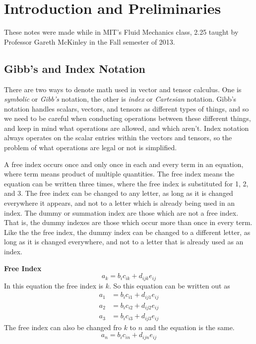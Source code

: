 \chapter{Introduction and Preliminaries}

These notes were made while in MIT's Fluid Mechanics class, 2.25 taught by Professor Gareth McKinley in the Fall semester of 2013.

\section{Gibb's and Index Notation}

There are two ways to denote math used in vector and tensor calculus.
One is \textit{symbolic} or \textit{Gibb's} notation, the other is \textit{index} or \textit{Cartesian} notation.
Gibb's notation handles scalars, vectors, and tensors as different types of things, and so we need to be careful when conducting operations between these different things, and keep in mind what operations are allowed, and which aren't.
Index notation always operates on the scalar entries within the vectors and tensors, so the problem of what operations are legal or not is simplified.

A free index occurs once and only once in each and every term in an equation, where term means product of multiple quantities.
The free index means the equation can be written three times, where the free index is substituted for 1, 2, and 3.
The free index can be changed to any letter, as long as it is changed everywhere it appears, and not to a letter which is already being used in an index.
The dummy or summation index are those which are not a free index.
That is, the dummy indexes are those which occur more than once in every term.
Like the the free index, the dummy index can be changed to a different letter, as long as it is changed everywhere, and not to a letter that is already used as an index.

\begin{example}
  \textbf{Free Index}
  \begin{equation*}
    a_{k}=b_{i}c_{ik}+d_{ijk}e_{ij}
  \end{equation*}
  In this equation the free index is $k$.
  So this equation can be written out as
  \begin{equation*}
    \begin{split}
      a_{1}&=b_{i}c_{i1}+d_{ij1}e_{ij} \\
      a_{2}&=b_{i}c_{i2}+d_{ij2}e_{ij} \\
      a_{3}&=b_{i}c_{i3}+d_{ij3}e_{ij}
    \end{split}
  \end{equation*}
  The free index can also be changed fro $k$ to $n$ and the equation is the same.
  \begin{equation*}
    a_{n}=b_{i}c_{in}+d_{ijn}e_{ij}
  \end{equation*}
\end{example}

